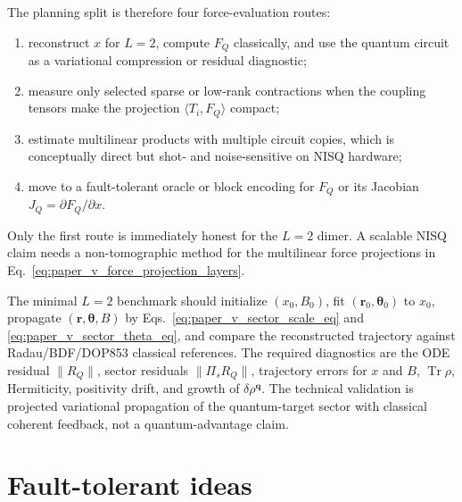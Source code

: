 \documentclass[
  reprint,
  amsmath,
  amssymb,
  aps,
  pra,
  nofootinbib,
  superscriptaddress,
  floatfix
]{revtex4-2}
\newcommand{\Tr}{\operatorname{Tr}}
\begin{document}
The planning split is therefore four force-evaluation routes:
\begin{enumerate}
\item reconstruct \(x\) for \(L=2\), compute \(F_Q\) classically, and use the
quantum circuit as a variational compression or residual diagnostic;
\item measure only selected sparse or low-rank contractions when the coupling
tensors make the projection \(\langle T_i,F_Q\rangle\) compact;
\item estimate multilinear products with multiple circuit copies, which is
conceptually direct but shot- and noise-sensitive on NISQ hardware;
\item move to a fault-tolerant oracle or block encoding for \(F_Q\) or its
Jacobian \(J_Q=\partial F_Q/\partial x\).
\end{enumerate}
Only the first route is immediately honest for the \(L=2\) dimer.  A scalable
NISQ claim needs a non-tomographic method for the multilinear force projections
in Eq.~\eqref{eq:paper_v_force_projection_layers}.

The minimal \(L=2\) benchmark should initialize \((x_0,B_0)\), fit
\((\bm r_0,\bm\theta_0)\) to \(x_0\), propagate
\((\bm r,\bm\theta,B)\) by Eqs.~\eqref{eq:paper_v_sector_scale_eq} and
\eqref{eq:paper_v_sector_theta_eq}, and compare the reconstructed trajectory
against Radau/BDF/DOP853 classical references.  The required diagnostics are
the ODE residual \(\|R_Q\|\), sector residuals \(\|\Pi_sR_Q\|\), trajectory
errors for \(x\) and \(B\), \(\Tr\rho\), Hermiticity, positivity drift, and
growth of \(\delta\rho^{\mathbf q}\).  The technical validation is projected
variational propagation of the quantum-target sector with classical coherent
feedback, not a quantum-advantage claim.

\section{Fault-tolerant ideas}
\label{sec:ft_ideas}
\end{document}

